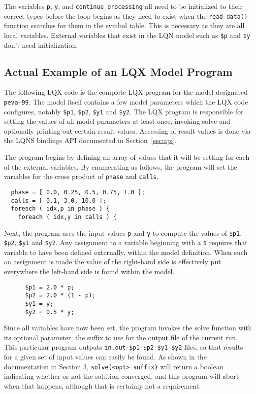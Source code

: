 The variables {\tt p}, {\tt y}, and {\tt continue\_processing} all need to be initialized to their correct 
types before the loop begins as they need to exist when the {\tt read\_data()} function searches for them
in the symbol table. This is necessary as they are all local variables. External variables that exist in
the LQN model such as {\tt \$p} and {\tt \$y} don't need initialization.

\subsection{Actual Example of an LQX Model Program}

The following LQX code is the complete LQX program for the model designated {\tt peva-99}.
The model itself contains a few model parameters which the LQX code configures, notably
{\tt \$p1}, {\tt \$p2}, {\tt \$y1} and {\tt \$y2}. The LQX program is responsible for
setting the values of all model parameters at least once, invoking solve and optionally
printing out certain result values. Accessing of result values is done via the LQNS 
bindings API documented in Section~\ref{sec:api}.

The program begins by defining an array of values that it will be setting for each of
the external variables. By enumerating as follows, the program will set the variables
for the cross product of {\tt phase} and {\tt calls}.

\lstset{language=LQX}
\lstset{name=lqx-program}
\begin{lstlisting}
  phase = [ 0.0, 0.25, 0.5, 0.75, 1.0 ];
  calls = [ 0.1, 3.0, 10.0 ];
  foreach ( idx,p in phase ) {
    foreach ( idx,y in calls ) {
    \end{lstlisting}
    
    Next, the program uses the input values {\tt p} and {\tt y} to compute the values of
    {\tt \$p1}, {\tt \$p2}, {\tt \$y1} and {\tt \$y2}. Any assignment to a variable 
    beginning with a {\tt \$} requires that variable to have been defined externally,
    within the model definition. When such an assignment is made the value of the right-hand 
    side is effectively put everywhere the left-hand side is found within the model.

    \lstset{ firstnumber= 5  }  
    \begin{lstlisting}
      $p1 = 2.0 * p;
      $p2 = 2.0 * (1 - p);
      $y1 = y;
      $y2 = 0.5 * y;
    \end{lstlisting}
    
    Since all variables have now been set, the program invokes the solve function with
    its optional parameter, the suffix to use for the output file of the current run.
    This particular program outputs {\tt in.out-\$p1-\$p2-\$y1-\$y2} files, so that
    results for a given set of input values can easily be found. As shown in the 
    documentation in Section 3, {\tt solve(<opt> suffix)} will return a boolean
    indicating whether or not the solution converged, and this program will abort
    when that happens, although that is certainly not a requirement.
    

